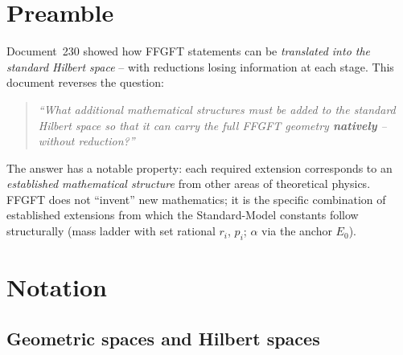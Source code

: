 
\section*{Preamble}

Document~230 showed how FFGFT statements can be \emph{translated into
the standard Hilbert space} -- with reductions losing information at
each stage. This document reverses the question:

\begin{quote}
\itshape
\enquote{What additional mathematical structures must be added to
the standard Hilbert space so that it can carry the full FFGFT
geometry \textbf{natively} -- without reduction?}
\end{quote}

The answer has a notable property: each required extension
corresponds to an \emph{established mathematical structure} from
other areas of theoretical physics. FFGFT does not \enquote{invent}
new mathematics; it is the specific combination of established
extensions from which the Standard-Model constants follow
structurally (mass ladder with set rational $r_i$, $p_i$; $\alpha$ via
the anchor $E_0$).

\section*{Notation}

\subsection*{Geometric spaces and Hilbert spaces}

